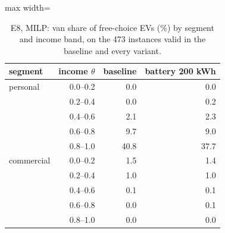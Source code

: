 \begin{table}[H]\centering
\small
\caption{E8, MILP: van share of free-choice EVs (\%) by segment and income band, on the 473 instances valid in the baseline and every variant.}\label{tab:bandE8}
\begin{adjustbox}{max width=\textwidth}\begin{tabular}{lrrr}\toprule
segment & income $\theta$ & baseline & battery 200 kWh \\ \midrule
personal & 0.0--0.2 & 0.0 & 0.0 \\
 & 0.2--0.4 & 0.0 & 0.2 \\
 & 0.4--0.6 & 2.1 & 2.3 \\
 & 0.6--0.8 & 9.7 & 9.0 \\
 & 0.8--1.0 & 40.8 & 37.7 \\
commercial & 0.0--0.2 & 1.5 & 1.4 \\
 & 0.2--0.4 & 1.0 & 1.0 \\
 & 0.4--0.6 & 0.1 & 0.1 \\
 & 0.6--0.8 & 0.0 & 0.1 \\
 & 0.8--1.0 & 0.0 & 0.0 \\
\bottomrule\end{tabular}\end{adjustbox}\end{table}
